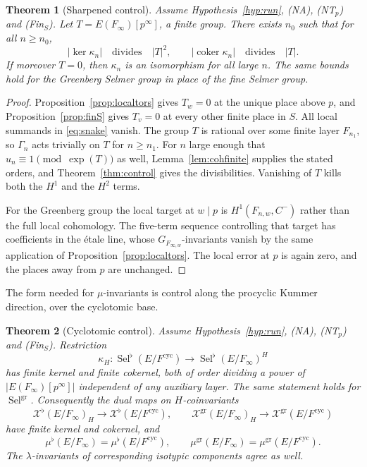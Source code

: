 \documentclass[11pt]{article}
\newtheorem{theorem}{Theorem}[section]
\theoremstyle{definition}
\theoremstyle{remark}
\newcommand{\Sel}{\operatorname{Sel}}
\newcommand{\coker}{\operatorname{coker}}
\newcommand{\cyc}{\mathrm{cyc}}
\newcommand{\gr}{\mathrm{gr}}
\newcommand{\flatp}{\flat}
\newcommand{\cX}{\mathcal{X}}
\begin{document}
\begin{theorem}[Sharpened control]
\label{thm:sharp}
Assume Hypothesis~\ref{hyp:run}, \textup{(NA)}, \textup{(NT\(_p\))} and \textup{(Fin\(_S\))}. Let \(T=E(F_\infty)[p^\infty]\), a finite group. There exists \(n_0\) such that for all \(n\ge n_0\),
\[
\bigl|\ker\kappa_n\bigr|
\quad\text{divides}\quad
|T|^2,
\qquad
\bigl|\coker\kappa_n\bigr|
\quad\text{divides}\quad
|T|.
\]
If moreover \(T=0\), then \(\kappa_n\) is an isomorphism for all large \(n\). The same bounds hold for the Greenberg Selmer group in place of the fine Selmer group.
\end{theorem}

\begin{proof}
Proposition~\ref{prop:localtors} gives \(T_w=0\) at the unique place above \(p\), and Proposition~\ref{prop:finS} gives \(T_v=0\) at every other finite place in \(S\). All local summands in \eqref{eq:snake} vanish. The group \(T\) is rational over some finite layer \(F_{n_1}\), so \(\Gamma_n\) acts trivially on \(T\) for \(n\ge n_1\). For \(n\) large enough that \(u_n\equiv 1\pmod{\exp(T)}\) as well, Lemma~\ref{lem:cohfinite} supplies the stated orders, and Theorem~\ref{thm:control} gives the divisibilities. Vanishing of \(T\) kills both the \(H^1\) and the \(H^2\) terms.

For the Greenberg group the local target at \(w\mid p\) is \(H^1(F_{n,w},C^-)\) rather than the full local cohomology. The five-term sequence controlling that target has coefficients in the \'etale line, whose \(G_{F_{\infty,w}}\)-invariants vanish by the same application of Proposition~\ref{prop:localtors}. The local error at \(p\) is again zero, and the places away from \(p\) are unchanged.
\end{proof}

The form needed for \(\mu\)-invariants is control along the procyclic Kummer direction, over the cyclotomic base.

\begin{theorem}[Cyclotomic control]
\label{thm:cyccontrol}
Assume Hypothesis~\ref{hyp:run}, \textup{(NA)}, \textup{(NT\(_p\))} and \textup{(Fin\(_S\))}. Restriction
\[
\kappa_H:
\Sel^{\flatp}(E/F^{\cyc})
\longrightarrow
\Sel^{\flatp}(E/F_\infty)^{H}
\]
has finite kernel and finite cokernel, both of order dividing a power of \(|E(F_\infty)[p^\infty]|\) independent of any auxiliary layer. The same statement holds for \(\Sel^{\gr}\). Consequently the dual maps on \(H\)-coinvariants
\[
\cX^{\flatp}(E/F_\infty)_H
\longrightarrow
\cX^{\flatp}(E/F^{\cyc}),
\qquad
\cX^{\gr}(E/F_\infty)_H
\longrightarrow
\cX^{\gr}(E/F^{\cyc})
\]
have finite kernel and cokernel, and
\begin{equation}
\label{eq:muequal}
\mu^{\flatp}(E/F_\infty)=\mu^{\flatp}(E/F^{\cyc}),
\qquad
\mu^{\gr}(E/F_\infty)=\mu^{\gr}(E/F^{\cyc}).
\end{equation}
The \(\lambda\)-invariants of corresponding isotypic components agree as well.
\end{theorem}
\end{document}
